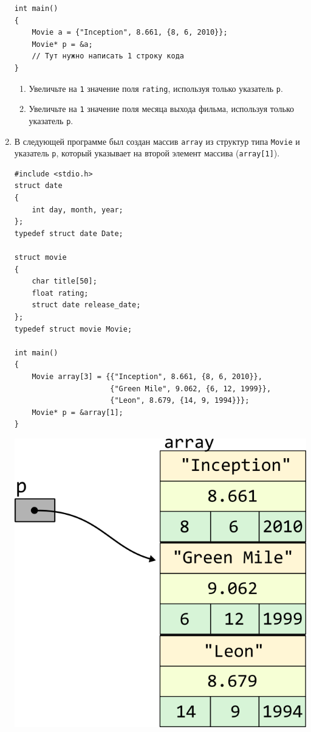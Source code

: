 \documentclass{article}
\begin{document}
\begin{enumerate}
\vspace{-10ex}
\begin{lstlisting}
int main() 
{
    Movie a = {"Inception", 8.661, {8, 6, 2010}};
    Movie* p = &a;
    // Тут нужно написать 1 строку кода
}
\end{lstlisting}
\begin{enumerate}
\item Увеличьте на \texttt{1} значение поля \texttt{rating}, используя только указатель \texttt{p}.
\item Увеличьте на \texttt{1} значение поля месяца выхода фильма, используя только указатель \texttt{p}.
\end{enumerate}

\newpage
\item В следующей программе был создан массив \texttt{array} из структур типа \texttt{Movie} и указатель \texttt{p}, который указывает на второй элемент массива (\texttt{array[1]}).
\begin{lstlisting}
#include <stdio.h>
struct date 
{
    int day, month, year;
};
typedef struct date Date;

struct movie 
{
    char title[50];
    float rating;
    struct date release_date;
};
typedef struct movie Movie;

int main() 
{
    Movie array[3] = {{"Inception", 8.661, {8, 6, 2010}}, 
                      {"Green Mile", 9.062, {6, 12, 1999}}, 
                      {"Leon", 8.679, {14, 9, 1994}}};
    Movie* p = &array[1];
}
\end{lstlisting}

\vspace{-59ex}
\begin{center}
\quad\quad\quad\quad\quad\quad\quad\quad\quad\quad\quad\quad\quad\quad\quad\quad\quad\quad\quad\quad\quad\quad\quad
\includegraphics[scale=1]{../images/pointer_schemes/pointer_to_array_of_struct_movie.png}
\end{center}


\end{enumerate}
\end{document}

